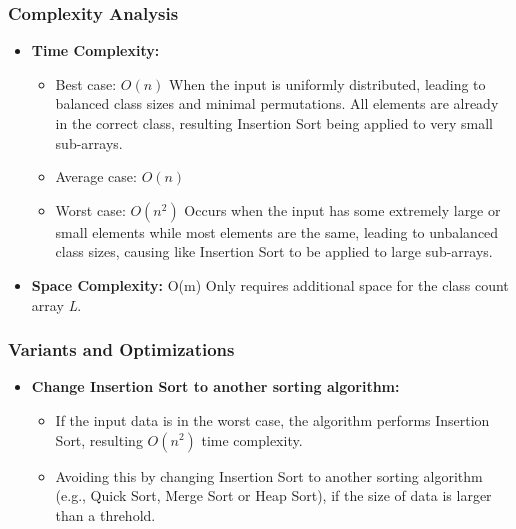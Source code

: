     \subsubsection{Complexity Analysis}
        \begin{itemize}
            \item \textbf{Time Complexity:}
            \begin{itemize}
                \item Best case: $O(n)$
                    \subitem When the input is uniformly distributed, leading to balanced class sizes and minimal permutations.
                    \subitem All elements are already in the correct class, resulting Insertion Sort being applied to very small sub-arrays.
                \item Average case: $O(n)$
                \item Worst case: $O(n^2)$ 
                    \subitem Occurs when the input has some extremely large or small elements while most elements are the same, leading to unbalanced class sizes, causing like Insertion Sort to be applied to large sub-arrays.
            \end{itemize}
            \item \textbf{Space Complexity:} O(m) 
                \subitem Only requires additional space for the class count array \textit{L}.
        \end{itemize}
        
    \subsubsection{Variants and Optimizations}
        \begin{itemize}
            \item \textbf{Change Insertion Sort to another sorting algorithm:}
            \begin{itemize}
                \item If the input data is in the worst case, the algorithm performs Insertion Sort, resulting $O(n^2)$ time complexity.
                \item Avoiding this by changing Insertion Sort to another sorting algorithm (e.g., Quick Sort, Merge Sort or Heap Sort), if the size of data is larger than a threhold.
            \end{itemize}
        \end{itemize}